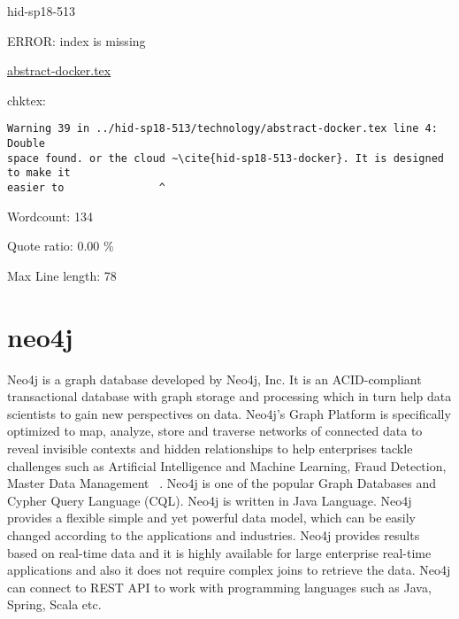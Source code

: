 \begin{IU}

hid-sp18-513

ERROR: index is missing

\href{https://github.com/cloudmesh-community/hid-sp18-513/blob/master//technology/abstract-docker.tex}{abstract-docker.tex}

 
chktex:
\begin{tiny}
\begin{verbatim}
Warning 39 in ../hid-sp18-513/technology/abstract-docker.tex line 4: Double
space found. or the cloud ~\cite{hid-sp18-513-docker}. It is designed to make it
easier to               ^
\end{verbatim}
\end{tiny}

Wordcount: 134


Quote ratio: 0.00 \%
 
Max Line length: 78
\end{IU}

\section{neo4j}

Neo4j is a graph database developed by Neo4j, Inc. It is an
ACID-compliant transactional database with graph storage and
processing which in turn help data scientists to gain new perspectives
on data. Neo4j's Graph Platform is specifically optimized to map,
analyze, store and traverse networks of connected data to reveal
invisible contexts and hidden relationships to help enterprises tackle
challenges such as Artificial Intelligence and Machine Learning, Fraud
Detection, Master Data Management ~\cite{hid-sp18-513-neo4j}. Neo4j is one 
of the popular Graph Databases and Cypher Query Language (CQL). 
Neo4j is written in Java Language. Neo4j provides a flexible simple and yet 
powerful data model, which can be easily changed according to the applications 
and industries. Neo4j provides results based on real-time data and it is highly
available for large enterprise real-time applications and also it does not 
require complex joins to retrieve the data. Neo4j can connect to REST API to 
work with programming languages such as Java, Spring, Scala etc.


